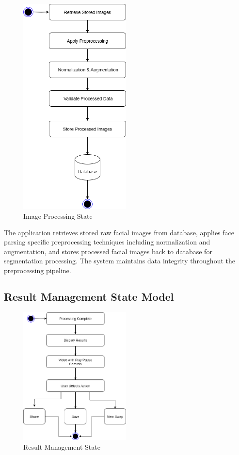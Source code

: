 \documentclass[12pt,a4paper]{report}
\begin{document}
\begin{figure}[H]
\centering
\includegraphics[width=0.5\textwidth]{figures/image_processing_state.png}
\caption{Image Processing State}
\label{fig:processing_state}
\end{figure}

The application retrieves stored raw facial images from database, applies face parsing specific preprocessing techniques including normalization and augmentation, and stores processed facial images back to database for segmentation processing. The system maintains data integrity throughout the preprocessing pipeline.

\subsection{Result Management State Model}

\begin{figure}[H]
\centering
\includegraphics[width=0.5\textwidth]{figures/result_management_state.png}
\caption{Result Management State}
\label{fig:result_management_state}
\end{figure}
\end{document}
